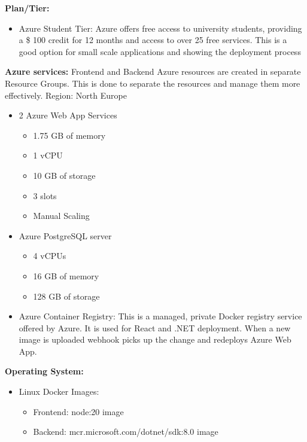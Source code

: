 \documentclass[
    english, %
]{VUMIFPSkursinis}
\begin{document}
\textbf{Plan/Tier:}
\begin{itemize}
    \item Azure Student Tier: Azure offers free access to university students, providing a \$ 100 credit for 12 months and access to over 25 free services. This is a good option for small scale applications and showing the deployment process
\end{itemize}

\textbf{Azure services:}
Frontend and Backend Azure resources are created in separate Resource Groups. This is done to separate the resources and manage them more effectively. Region: North Europe
\begin{itemize}
    \item 2 Azure Web App Services
        \begin{itemize}
            \item 1.75 GB of memory
            \item 1 vCPU
            \item 10 GB of storage
            \item 3 slots
            \item Manual Scaling
        \end{itemize}
    \item Azure PostgreSQL server
        \begin{itemize}
            \item 4 vCPUs
            \item 16 GB of memory
            \item 128 GB of storage
        \end{itemize}
    \item Azure Container Registry: This is a managed, private Docker registry service offered by Azure. It is used for React and .NET deployment. When a new image is uploaded webhook picks up the change and redeploys Azure Web App.
\end{itemize}

\textbf{Operating System:}
\begin{itemize}
    \item Linux Docker Images:
        \begin{itemize}
            \item Frontend: node:20 image
            \item Backend: mcr.microsoft.com/dotnet/sdk:8.0 image
        \end{itemize}
\end{itemize}
\end{document}
